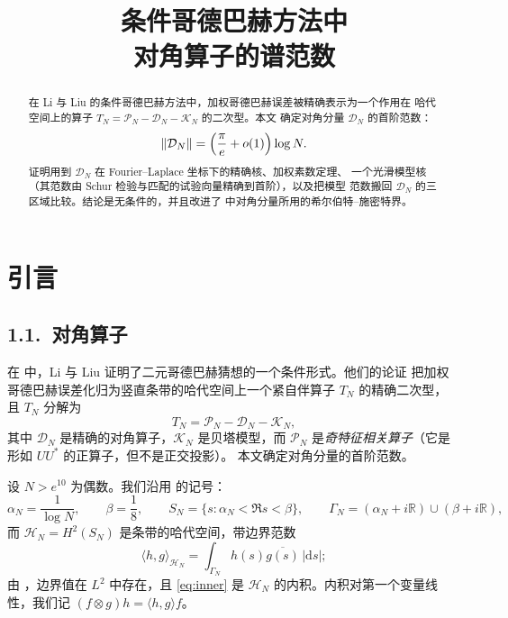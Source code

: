 \documentclass[12pt,a4paper]{amsart}
\numberwithin{equation}{section}
\theoremstyle{plain}
\theoremstyle{definition}
\begin{document}
\title[对角算子的谱范数]{条件哥德巴赫方法中\\ 对角算子的谱范数}

\author{}

\date{}



\begin{abstract}
在 Li 与 Liu 的条件哥德巴赫方法中，加权哥德巴赫误差被精确表示为一个作用在
哈代空间上的算子 $T_N=\mathcal P_N-\mathcal D_N-\mathcal K_N$ 的二次型。本文
确定对角分量 $\mathcal D_N$ 的首阶范数：
\[
 \|\mathcal D_N\|=\Bigl(\frac{\pi}{e}+o(1)\Bigr)\log N .
\]
证明用到 $\mathcal D_N$ 在 Fourier--Laplace 坐标下的精确核、加权素数定理、
一个光滑模型核（其范数由 Schur 检验与匹配的试验向量精确到首阶），以及把模型
范数搬回 $\mathcal D_N$ 的三区域比较。结论是无条件的，并且改进了 \cite{LL}
中对角分量所用的希尔伯特--施密特界。
\end{abstract}

\maketitle

\section{引言}

\subsection*{1.1.\ 对角算子}

在 \cite{LL} 中，Li 与 Liu 证明了二元哥德巴赫猜想的一个条件形式。他们的论证
把加权哥德巴赫误差化归为竖直条带的哈代空间上一个紧自伴算子 $T_N$ 的精确二次型，
且 $T_N$ 分解为
\begin{equation}\label{eq:split}
 T_N=\mathcal P_N-\mathcal D_N-\mathcal K_N,
\end{equation}
其中 $\mathcal D_N$ 是精确的对角算子，$\mathcal K_N$ 是贝塔模型，而
$\mathcal P_N$ 是\emph{奇特征相关算子}（它是形如 $UU^*$ 的正算子，但不是正交投影）。
本文确定对角分量的首阶范数。

设 $N>e^{10}$ 为偶数。我们沿用 \cite[\S5--6]{LL} 的记号：
\[
 \alpha_N=\frac1{\log N},\qquad \beta=\frac18,\qquad
 S_N=\{s:\alpha_N<\Re s<\beta\},\qquad
 \Gamma_N=(\alpha_N+i\mathbb R)\cup(\beta+i\mathbb R),
\]
而 $\mathcal H_N=H^2(S_N)$ 是条带的哈代空间，带边界范数
\begin{equation}\label{eq:inner}
 \langle h,g\rangle_{\mathcal H_N}
 =\int_{\Gamma_N}h(s)\overline{g(s)}\,|\mathrm ds|;
\end{equation}
由 \cite[引理 5.2]{LL}，边界值在 $L^2$ 中存在，且 \eqref{eq:inner} 是
$\mathcal H_N$ 的内积。内积对第一个变量线性，我们记
$(f\otimes g)h=\langle h,g\rangle f$。
\end{document}
